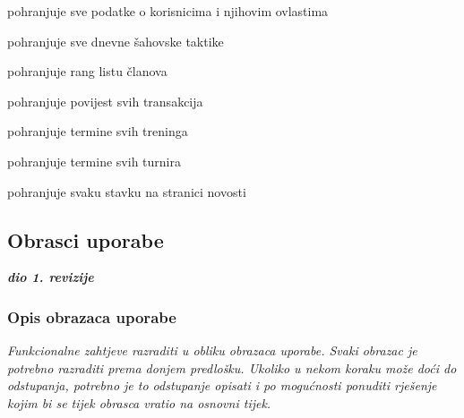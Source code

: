 \begin{packed_enum}
\begin{packed_enum}
				\end{packed_enum}
			
				\item {}
				
				\begin{packed_enum}
					
					\item pohranjuje sve podatke o korisnicima i njihovim ovlastima
					\item pohranjuje sve dnevne šahovske taktike
					\item pohranjuje rang listu članova
					\item pohranjuje povijest svih transakcija
					\item pohranjuje termine svih treninga
					\item pohranjuje termine svih turnira
					\item pohranjuje svaku stavku na stranici novosti
					
				\end{packed_enum}
				
			\end{packed_enum}
			
			\eject 
			
			
				
			\subsection{Obrasci uporabe}
				
				\textbf{\textit{dio 1. revizije}}
				
				\subsubsection{Opis obrazaca uporabe}
					\textit{Funkcionalne zahtjeve razraditi u obliku obrazaca uporabe. Svaki obrazac je potrebno razraditi prema donjem predlošku. Ukoliko u nekom koraku može doći do odstupanja, potrebno je to odstupanje opisati i po mogućnosti ponuditi rješenje kojim bi se tijek obrasca vratio na osnovni tijek.}\\
					
